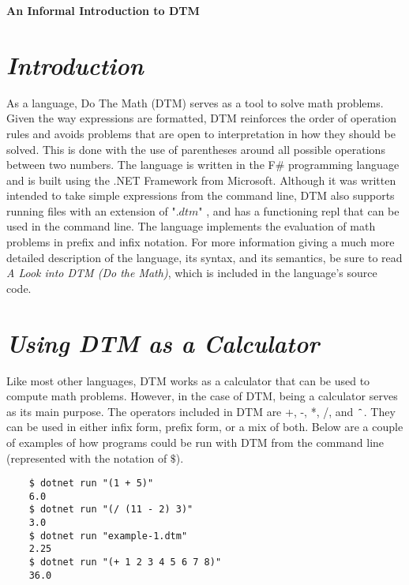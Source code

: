 \documentclass[10pt]{article}
\begin{document}
\newcommand{\YOURID}{Josiel Aponte}	
\newcommand{\MyLang}{DTM}	
\newcommand{\ProblemHeader}

\vspace{\baselineskip}

\begin{center}
    \Large\textbf{An Informal Introduction to DTM}\\
\end{center}

\section{\textit{Introduction}}

As a language, Do The Math (DTM) serves as a tool to solve math problems. Given the way expressions are formatted, DTM reinforces the order of operation rules and avoids problems that are open to interpretation in how they should be solved. This is done with the use of parentheses around all possible operations between two numbers. The language is written in the F\# programming language and is built using the .NET Framework from Microsoft. Although it was written intended to take simple expressions from the command line, DTM also supports running files with an extension of "$.dtm$" , and has a functioning repl that can be used in the command line. The language implements the evaluation of math problems in prefix and infix notation. For more information giving a much more detailed description of the language, its syntax, and its semantics, be sure to read \textit{A Look into DTM (Do the Math)}, which is included in the language’s source code.

\section{\textit{Using DTM as a Calculator}}

Like most other languages, DTM works as a calculator that can be used to compute math problems. However, in the case of DTM, being a calculator serves as its main purpose.  The operators included in DTM are +, -, *, /, and $\texttt{\^{}}$. They can be used in either infix form, prefix form, or a mix of both. Below are a couple of examples of how programs could be run with DTM from the command line (represented with the notation of $\texttt{\$}$).

\begin{verbatim}
    $ dotnet run "(1 + 5)"
    6.0
    $ dotnet run "(/ (11 - 2) 3)"
    3.0
    $ dotnet run "example-1.dtm"
    2.25
    $ dotnet run "(+ 1 2 3 4 5 6 7 8)"
    36.0
\end{verbatim}
\end{document}
